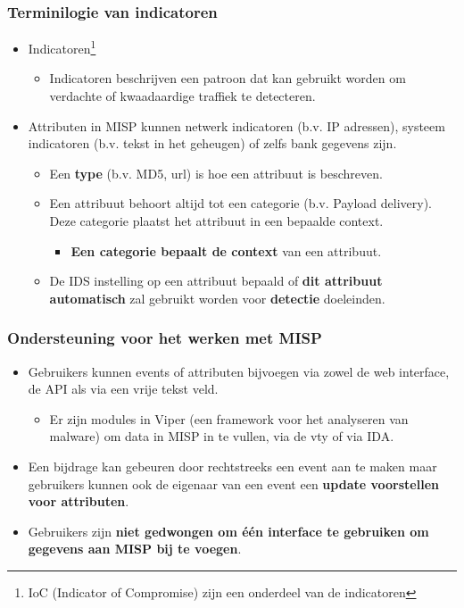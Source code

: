 \begin{frame}
        \frametitle{Terminilogie van indicatoren}
        \begin{itemize}
                \item Indicatoren\footnote{IoC (Indicator of Compromise) zijn een onderdeel van de indicatoren}
                        \begin{itemize}
                                \item Indicatoren beschrijven een patroon dat kan gebruikt worden om verdachte of kwaadaardige traffiek te detecteren.
                        \end{itemize}
                \item Attributen in MISP kunnen netwerk indicatoren (b.v. IP adressen), systeem indicatoren (b.v. tekst in het geheugen) of zelfs bank gegevens zijn.
                \begin{itemize}
                        \item Een {\bf type} (b.v. MD5, url) is hoe een attribuut is beschreven.
                \end{itemize}
                \begin{itemize}
                \item Een attribuut behoort altijd tot een categorie (b.v. Payload delivery). Deze categorie plaatst het attribuut in een bepaalde context.
                        \begin{itemize}
                                \item {\bf Een categorie bepaalt de context } van een attribuut.
                        \end{itemize}
                \item De IDS instelling op een attribuut bepaald of {\bf dit attribuut automatisch} zal gebruikt worden voor {\bf detectie} doeleinden.
                \end{itemize}
        \end{itemize}
\end{frame}

\begin{frame}
        \frametitle{Ondersteuning voor het werken met MISP}
        \begin{itemize}
            \item Gebruikers kunnen events of attributen bijvoegen via zowel de web interface, de API als via een vrije tekst veld.
                \begin{itemize}
                        \item Er zijn modules in Viper (een framework voor het analyseren van malware) om data in MISP in te vullen, via de vty of via IDA.
                \end{itemize}
        \item Een bijdrage kan gebeuren door rechtstreeks een event aan te maken maar gebruikers kunnen ook de eigenaar van een event een {\bf update voorstellen voor attributen}.
            \item Gebruikers zijn {\bf niet gedwongen om één interface te gebruiken om gegevens aan MISP bij te voegen}.
        \end{itemize}
\end{frame}

